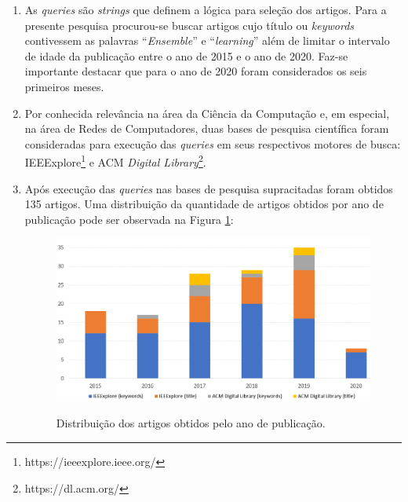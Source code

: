 \begin{enumerate}
    
    \item As \textit{queries} são \textit{strings} que definem a lógica para seleção dos artigos. Para a presente pesquisa procurou-se buscar artigos cujo título ou \textit{keywords} contivessem as palavras ``\textit{Ensemble}'' e ``\textit{learning}'' além de limitar o intervalo de idade da publicação entre o ano de 2015 e o ano de 2020. Faz-se importante destacar que para o ano de 2020 foram considerados os seis primeiros meses.
    
    \item Por conhecida relevância na área da Ciência da Computação e, em especial, na área de Redes de Computadores, duas bases de pesquisa científica foram consideradas para execução das \textit{queries} em seus respectivos motores de busca: IEEExplore\footnote{https://ieeexplore.ieee.org/} e ACM \textit{Digital Library}\footnote{https://dl.acm.org/}.
    
    \item Após execução das \textit{queries} nas bases de pesquisa supracitadas foram obtidos 135 artigos. Uma distribuição da quantidade de artigos obtidos por ano de publicação pode ser observada na Figura \ref{fig:grafico_num_papers}:
    
    
    \begin{figure}[H]
    \centering
    \caption{Distribuição dos artigos obtidos pelo ano de publicação.} \includegraphics[width=12cm,height=\textwidth,keepaspectratio]{figs/grafico_num_papers.png}
    \newline {}\label{fig:grafico_num_papers}
    \end{figure}
    

\end{enumerate}
